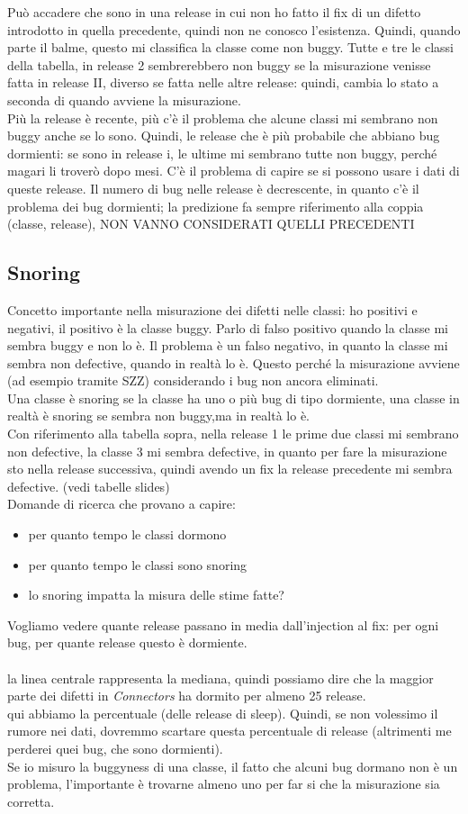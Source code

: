 \documentclass{article}
\begin{document}
Può accadere che sono in una release in cui non ho fatto il fix di un difetto introdotto in quella precedente, quindi non ne conosco l'esistenza. Quindi, quando parte il balme, questo mi classifica la classe come non buggy. Tutte e tre le classi della tabella, in release 2 sembrerebbero non buggy se la misurazione venisse fatta in release II, diverso se fatta nelle altre release: quindi, cambia lo stato a seconda di quando avviene la misurazione.\\ Più la release è recente, più c'è il problema che alcune classi mi sembrano non buggy anche se lo sono. Quindi, le release che è più probabile che abbiano bug dormienti: se sono in release i, le ultime mi sembrano tutte non buggy, perché magari li troverò dopo mesi. C'è il problema di capire se si possono usare i dati di queste release. Il numero di bug nelle release è decrescente, in quanto c'è il problema dei bug dormienti; la predizione fa sempre riferimento alla coppia (classe, release), NON VANNO CONSIDERATI QUELLI PRECEDENTI
\subsection{Snoring}
Concetto importante nella misurazione dei difetti nelle classi: ho positivi e negativi, il positivo è la classe buggy. Parlo di falso positivo quando la classe mi sembra buggy e non lo è. Il problema è un falso negativo, in quanto la classe mi sembra non defective, quando in realtà lo è. Questo perché la misurazione avviene (ad esempio tramite SZZ) considerando i bug non ancora eliminati.\\ Una classe è snoring se la classe ha uno o più bug di tipo dormiente, una classe in realtà è snoring se sembra non buggy,ma in realtà lo è.\\ Con riferimento alla tabella sopra, nella release 1 le prime due classi mi sembrano non defective, la classe 3 mi sembra defective, in quanto per fare la misurazione sto nella release successiva, quindi avendo un fix la release precedente mi sembra defective. (vedi tabelle slides)\\
Domande di ricerca che provano a capire:
\begin{itemize}
\item per quanto tempo le classi dormono
\item per quanto tempo le classi sono snoring
\item lo snoring impatta la misura delle stime fatte?
\end{itemize}
Vogliamo vedere quante release passano in media dall'injection al fix: per ogni bug, per quante release questo è dormiente.\\
\\ la linea centrale rappresenta la mediana, quindi possiamo dire che la maggior parte dei difetti in \textit{Connectors} ha dormito per almeno 25 release.
\\ qui abbiamo la percentuale (delle release di sleep). Quindi, se non volessimo il rumore nei dati, dovremmo scartare questa percentuale di release (altrimenti me perderei quei bug, che sono dormienti).\\ Se io misuro la buggyness di una classe, il fatto che alcuni bug dormano non è un problema, l'importante è trovarne almeno uno per far si che la misurazione sia corretta.
\end{document}
